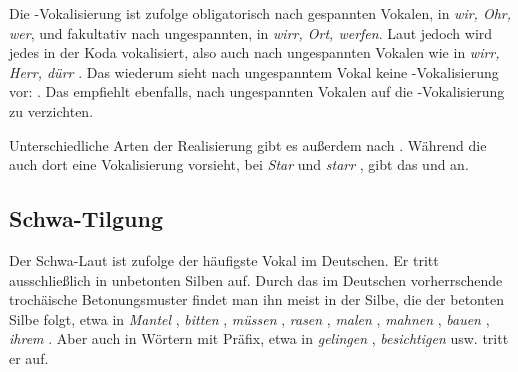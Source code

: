 Die -Vokalisierung ist \citet[144]{Noske1993} zufolge obligatorisch nach gespannten Vokalen, \zB in \textit{wir, Ohr, wer}, und fakultativ nach ungespannten, \zB in \textit{wirr, Ort, werfen}. Laut \citet[856f]{Duden2022} jedoch wird jedes  in der Koda vokalisiert, also auch nach ungespannten Vokalen wie in \textit{wirr, Herr, dürr} \textipa{[vI5, hE5, dY5]}. Das \citet{DudenAussprache2023} wiederum sieht nach ungespanntem Vokal keine -Vokalisierung vor: . Das \citet[140]{DudenZweifelsfaelle2021} empfiehlt ebenfalls, nach ungespannten Vokalen auf die -Vokalisierung zu verzichten. 

Unterschiedliche Arten der Realisierung gibt es außerdem nach . Während die \citet[857]{Duden2022} auch dort eine Vokalisierung vorsieht, \zB bei \textit{Star} \textipa{[Sta:5]} und \textit{starr} \textipa{[Sta5]}, gibt das \citet[819]{DudenAussprache2023} \textipa{[Sta:]} und \textipa{[Star]} an.


\subsection{Schwa-Tilgung}\label{sec:Schwatilgung}

Der Schwa-Laut  ist \citet[106]{KoherlRodgers2001} zufolge der häufigste Vokal im Deutschen. Er tritt ausschließlich in unbetonten Silben auf. Durch das im Deutschen vorherrschende trochäische Betonungsmuster findet man ihn meist in der Silbe, die der betonten Silbe folgt, etwa in \textit{Mantel} , \textit{bitten} , \textit{müssen} , \textit{rasen} , \textit{malen} , \textit{mahnen} , \textit{bauen} , \textit{ihrem} . Aber auch in Wörtern mit Präfix, etwa in \textit{gelingen} , \textit{besichtigen}  usw. tritt er auf.

